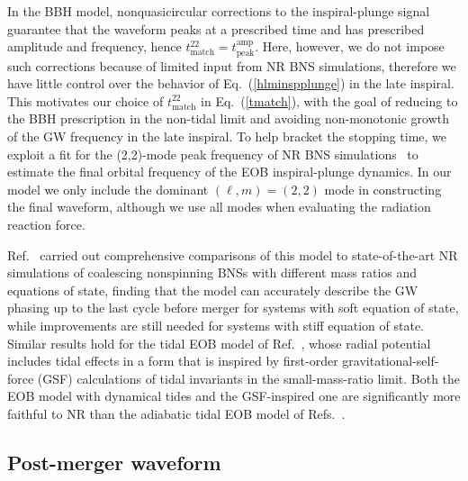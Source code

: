 \documentclass[prd,aps,letter,twocolumn,floatfix,notitlepage,nofootinbib]{revtex4-1}
\begin{document}
In the BBH model, nonquasicircular corrections to the inspiral-plunge signal guarantee that the waveform peaks at a prescribed time and has prescribed amplitude and frequency, hence $t_{\textrm{match}}^{22}=t_{\textrm{peak}}^{\textrm{amp}}$. Here, however, we do not impose such corrections because of limited input from NR BNS simulations, therefore we have little control over the behavior of Eq.~(\ref{hlminspplunge}) in the late inspiral. This motivates our choice of $t_{\textrm{match}}^{22}$ in Eq.~(\ref{tmatch}), with the goal of reducing to the BBH prescription in the non-tidal limit and avoiding non-monotonic growth of the GW frequency in the late inspiral. To help bracket the stopping time, we exploit a fit for the (2,2)-mode peak frequency of NR BNS simulations~\cite{Bernuzzi:2015rla} to estimate the final orbital frequency of the EOB inspiral-plunge dynamics. %
In our model we only include the dominant $(\ell,m)=(2,2)$ mode in constructing the final waveform, although we use all modes when evaluating the radiation reaction force.

Ref.~\cite{Dietrich:2017feu} carried out comprehensive comparisons of this model to state-of-the-art NR simulations of coalescing nonspinning BNSs with different mass ratios and equations of state, finding that the model can accurately describe the GW phasing up to the last cycle before merger for systems with soft equation of state, while improvements are still needed for systems with stiff equation of state. Similar results hold for the tidal EOB model of Ref.~\cite{Bernuzzi:2014owa}, whose radial potential includes tidal effects in a form that is inspired by first-order gravitational-self-force (GSF) calculations of tidal invariants in the small-mass-ratio limit. Both the EOB model with dynamical tides and the GSF-inspired one are significantly more faithful to NR than the adiabatic tidal EOB model of Refs.~\cite{Damour:2009wj,Bini:2012gu}.

\subsection{Post-merger waveform}
\end{document}
